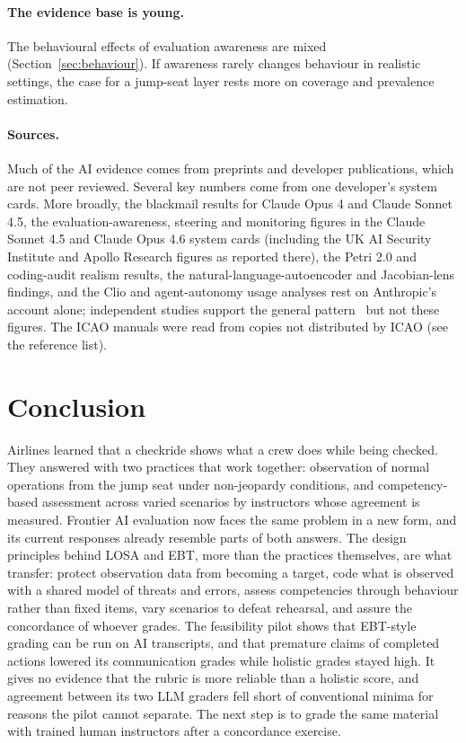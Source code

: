 \documentclass[11pt]{article}
\begin{document}
\paragraph{The evidence base is young.} The behavioural effects of evaluation awareness are mixed (Section~\ref{sec:behaviour}). If awareness rarely changes behaviour in realistic settings, the case for a jump-seat layer rests more on coverage and prevalence estimation.

\paragraph{Sources.} Much of the AI evidence comes from preprints and developer publications, which are not peer reviewed. Several key numbers come from one developer's system cards. More broadly, the blackmail results for Claude Opus 4 and Claude Sonnet 4.5, the evaluation-awareness, steering and monitoring figures in the Claude Sonnet 4.5 and Claude Opus 4.6 system cards (including the UK AI Security Institute and Apollo Research figures as reported there), the Petri 2.0 and coding-audit realism results, the natural-language-autoencoder and Jacobian-lens findings, and the Clio and agent-autonomy usage analyses rest on Anthropic's account alone; independent studies support the general pattern~\cite{needham2025,schoen2025,abdelnabi2025,souly2026,williams2026} but not these figures. The ICAO manuals were read from copies not distributed by ICAO (see the reference list).

\section{Conclusion}\label{sec:conclusion}

Airlines learned that a checkride shows what a crew does while being checked. They answered with two practices that work together: observation of normal operations from the jump seat under non-jeopardy conditions, and competency-based assessment across varied scenarios by instructors whose agreement is measured. Frontier AI evaluation now faces the same problem in a new form, and its current responses already resemble parts of both answers. The design principles behind LOSA and EBT, more than the practices themselves, are what transfer: protect observation data from becoming a target, code what is observed with a shared model of threats and errors, assess competencies through behaviour rather than fixed items, vary scenarios to defeat rehearsal, and assure the concordance of whoever grades. The feasibility pilot shows that EBT-style grading can be run on AI transcripts, and that premature claims of completed actions lowered its communication grades while holistic grades stayed high. It gives no evidence that the rubric is more reliable than a holistic score, and agreement between its two LLM graders fell short of conventional minima for reasons the pilot cannot separate. The next step is to grade the same material with trained human instructors after a concordance exercise.
\end{document}
